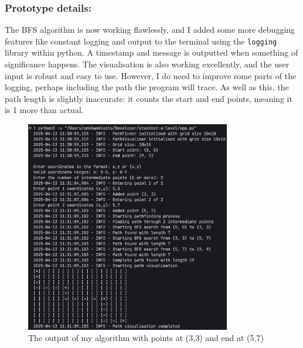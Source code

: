 \subsubsection{Prototype details:} 
The BFS algorithm is now working flawlessly, and I added some more debugging features like constant logging and output to the terminal using the \verb|logging| library within python. A timestamp and message is outputted when something of significance happens. The visualisation is also working excellently, and the user input is robust and easy to use. However, I do need to improve some parts of the logging, perhaps including the path the program will trace. As well as this, the path length is slightly inaccurate: it counts the start and end points, meaning it is 1 more than actual.

\begin{figure}[htbp]
    \centering
    \includegraphics[width=0.8\textwidth]{Images/sa2test1.png}
    \caption{The output of my algorithm with points at (3,3) and end at (5,7)}
\end{figure}

\newpage

